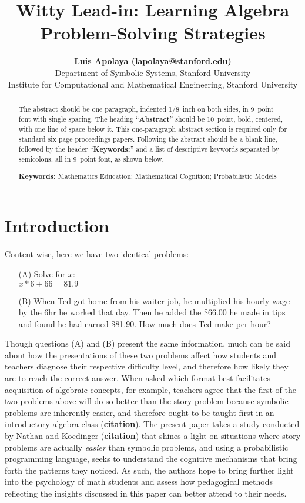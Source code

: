 \documentclass[10pt,letterpaper]{article}
\title{Witty Lead-in: Learning Algebra Problem-Solving Strategies}
\author{{\large \bf Luis Apolaya (lapolaya@stanford.edu)} \\
  Department of Symbolic Systems, Stanford University
  \AND {\large \bf Amy Shoemaker (amyshoe@stanford.edu)} \\
  Institute for Computational and Mathematical Engineering, Stanford University}
\begin{document}
\maketitle


\begin{abstract}
The abstract should be one paragraph, indented 1/8~inch on both sides,
in 9~point font with single spacing. The heading ``{\bf Abstract}''
should be 10~point, bold, centered, with one line of space below
it. This one-paragraph abstract section is required only for standard
six page proceedings papers. Following the abstract should be a blank
line, followed by the header ``{\bf Keywords:}'' and a list of
descriptive keywords separated by semicolons, all in 9~point font, as
shown below.

\textbf{Keywords:} 
Mathematics Education; Mathematical Cognition; Probabilistic Models
\end{abstract}


\section{Introduction}

Content-wise, here we have two identical problems:

\begin{enumerate}
\item[(A)] Solve for $x$:\\ $x * 6 + 66 = 81.9$

\item[(B)] When Ted got home from his waiter job, he multiplied his hourly wage by the 6hr he worked that day. Then he added the \$66.00 he made in tips and found he had earned \$81.90. How much does Ted make per hour?
\end{enumerate}

Though questions (A) and (B) present the same information, much can be said about how the presentations of these two problems affect how students and teachers diagnose their respective difficulty level, and therefore how likely they are to reach the correct answer. When asked which format best facilitates acquisition of algebraic concepts, for example, teachers agree that the first of the two problems above will do so better than the story problem because symbolic problems are inherently easier, and therefore ought to be taught first in an introductory algebra class (\textbf{citation}). The present paper takes a study conducted by Nathan and Koedinger (\textbf{citation}) that shines a light on situations where story problems are actually \textit{easier} than symbolic problems, and using a probabilistic programming language, seeks to understand the cognitive mechanisms that bring forth the patterns they noticed. As such, the authors hope to bring further light into the psychology of math students and assess how pedagogical methods reflecting the insights discussed in this paper can better attend to their needs.
\end{document}
